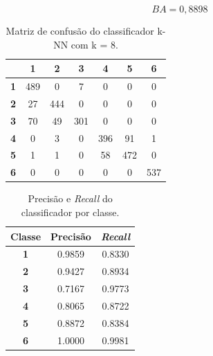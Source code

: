 \begin{equation}\label{eq:ba_lr_2000}
BA = 0,8898
\end{equation}

\begin{table}[H]
\centering
\begin{tabular}{c|c|c|c|c|c|c|}
	\cline{2-7}
	& \textbf{1} & \textbf{2} & \textbf{3} & \textbf{4} & \textbf{5} & \textbf{6} \\ \hline\hline
	\multicolumn{1}{|c||}{\textbf{1}} & 489        & 0          & 7          & 0          & 0          & 0          \\ \hline
	\multicolumn{1}{|c||}{\textbf{2}} & 27         & 444        & 0          & 0          & 0          & 0          \\ \hline
	\multicolumn{1}{|c||}{\textbf{3}} & 70         & 49         & 301        & 0          & 0          & 0          \\ \hline
	\multicolumn{1}{|c||}{\textbf{4}} & 0          & 3          & 0          & 396        & 91         & 1          \\ \hline
	\multicolumn{1}{|c||}{\textbf{5}} & 1          & 1          & 0          & 58         & 472        & 0          \\ \hline
	\multicolumn{1}{|c||}{\textbf{6}} & 0          & 0          & 0          & 0          & 0          & 537        \\ \hline
\end{tabular}
\caption{Matriz de confusão do classificador k-NN com k = 8.}
\label{tab:mc_lr_2000}
\end{table}

\begin{table}[H]
\centering
\begin{tabular}{c|c|c}
	\textbf{Classe} & \textbf{Precisão} & \textit{\textbf{Recall}} \\ \hline
	\textbf{1}      & 0.9859            & 0.8330                   \\
	\textbf{2}      & 0.9427            & 0.8934                   \\
	\textbf{3}      & 0.7167            & 0.9773                   \\
	\textbf{4}      & 0.8065            & 0.8722                   \\
	\textbf{5}      & 0.8872            & 0.8384                   \\
	\textbf{6}      & 1.0000            & 0.9981                  
\end{tabular}
\caption{Precisão e \textit{Recall} do classificador por classe.}
\label{tab:pr_lr_2000}
\end{table}

